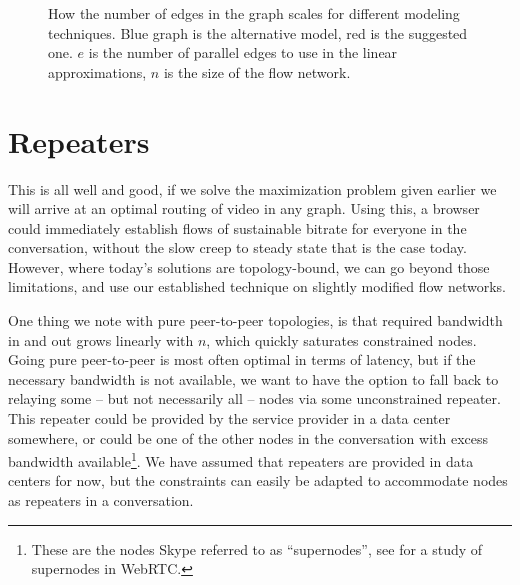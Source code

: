 \begin{figure}
    \centering
    \caption{How the number of edges in the graph scales for different modeling techniques. Blue graph is the alternative model, red is the suggested one. $e$ is the number of parallel edges to use in the linear approximations, $n$ is the size of the flow network.}
    \label{fig:model-scaling}
\end{figure}


\section{Repeaters}\label{sec:repeaters}

This is all well and good, if we solve the maximization problem given earlier we will arrive at an optimal routing of video in any graph. Using this, a browser could immediately establish flows of sustainable bitrate for everyone in the conversation, without the slow creep to steady state that is the case today. However, where today's solutions are topology-bound, we can go beyond those limitations, and use our established technique on slightly modified flow networks.

One thing we note with pure peer-to-peer topologies, is that required bandwidth in and out grows linearly with $n$, which quickly saturates constrained nodes. Going pure peer-to-peer is most often optimal in terms of latency, but if the necessary bandwidth is not available, we want to have the option to fall back to relaying some -- but not necessarily all -- nodes via some unconstrained repeater. This repeater could be provided by the service provider in a data center somewhere, or could be one of the other nodes in the conversation with excess bandwidth available\footnote{These are the nodes Skype referred to as ``supernodes'', see \cite{tree-topology-webrtc} for a study of supernodes in WebRTC.}. We have assumed that repeaters are provided in data centers for now, but the constraints can easily be adapted to accommodate nodes as repeaters in a conversation.


